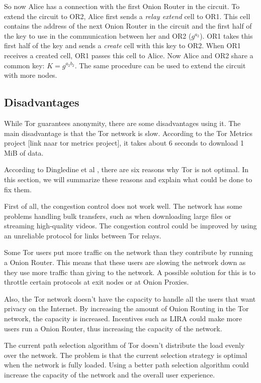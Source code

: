 \documentclass[journal]{IEEEtran}
\begin{document}
		So now Alice has a connection with the first Onion Router in the circuit. To extend the circuit to OR2, Alice first sends a \emph{relay extend} cell to OR1. This cell contains the address of the next Onion Router in the circuit and the first half of the key to use in the communication between her and OR2 ($ g^{a_2} $). OR1 takes this first half of the key and sends a \emph{create} cell with this key to OR2. When OR1 receives a created cell, OR1 passes this cell to Alice. Now Alice and OR2 share a common key: $ K = g^{a_2b_2} $. The same procedure can be used to extend the circuit with more nodes.
			
	\subsection{Disadvantages}
	\label{ss:tor_disadvantages}
		While Tor guarantees anonymity, there are some disadvantages using it. The main disadvantage is that the Tor network is slow. According to the Tor Metrics project [link naar tor metrics project], it takes about 6 seconds to download 1 MiB of data.
		
		According to Dingledine et al \cite{dingledine2009performance}, there are six reasons why Tor is not optimal. In this section, we will summarize these reasons and explain what could be done to fix them.
		
		First of all, the congestion control does not work well. The network has some problems handling bulk transfers, such as when downloading large files or streaming high-quality videos. The congestion control could be improved by using an unreliable protocol for links between Tor relays.		
		
		Some Tor users put more traffic on the network than they contribute by running a Onion Router. This means that these users are slowing the network down as they use more traffic than giving to the network. A possible solution for this is to throttle certain protocols at exit nodes or at Onion Proxies.
		
		Also, the Tor network doesn't have the capacity to handle all the users that want privacy on the Internet. By increasing the amount of Onion Routing in the Tor network, the capacity is increased. Incentives such as LIRA \cite{jansen13lira} could make more users run a Onion Router, thus increasing the capacity of the network.		
		
		The current path selection algorithm of Tor doesn't distribute the load evenly over the network. The problem is that the current selection strategy is optimal when the network is fully loaded. Using a better path selection algorithm could increase the capacity of the network and the overall user experience.		
		
\end{document}
